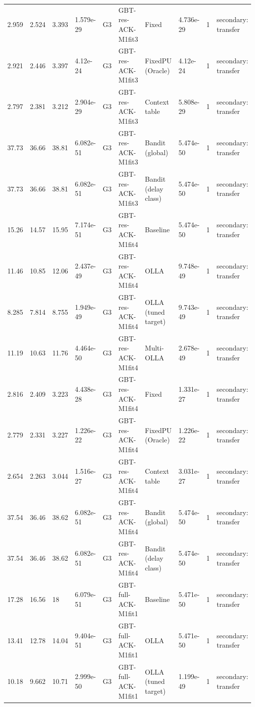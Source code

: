 \documentclass[10pt]{article}
\begin{document}
\begin{landscape}
\begin{longtable}{@{}llllllllll@{}}
2.959 & 2.524 & 3.393 & 1.579e-29 & G3 & GBT-res-ACK-M1fit3 & Fixed & 4.736e-29 & 1 & secondary: transfer \\
2.921 & 2.446 & 3.397 & 4.12e-24 & G3 & GBT-res-ACK-M1fit3 & FixedPU (Oracle) & 4.12e-24 & 1 & secondary: transfer \\
2.797 & 2.381 & 3.212 & 2.904e-29 & G3 & GBT-res-ACK-M1fit3 & Context table & 5.808e-29 & 1 & secondary: transfer \\
37.73 & 36.66 & 38.81 & 6.082e-51 & G3 & GBT-res-ACK-M1fit3 & Bandit (global) & 5.474e-50 & 1 & secondary: transfer \\
37.73 & 36.66 & 38.81 & 6.082e-51 & G3 & GBT-res-ACK-M1fit3 & Bandit (delay class) & 5.474e-50 & 1 & secondary: transfer \\
15.26 & 14.57 & 15.95 & 7.174e-51 & G3 & GBT-res-ACK-M1fit4 & Baseline & 5.474e-50 & 1 & secondary: transfer \\
11.46 & 10.85 & 12.06 & 2.437e-49 & G3 & GBT-res-ACK-M1fit4 & OLLA & 9.748e-49 & 1 & secondary: transfer \\
8.285 & 7.814 & 8.755 & 1.949e-49 & G3 & GBT-res-ACK-M1fit4 & OLLA (tuned target) & 9.743e-49 & 1 & secondary: transfer \\
11.19 & 10.63 & 11.76 & 4.464e-50 & G3 & GBT-res-ACK-M1fit4 & Multi-OLLA & 2.678e-49 & 1 & secondary: transfer \\
2.816 & 2.409 & 3.223 & 4.438e-28 & G3 & GBT-res-ACK-M1fit4 & Fixed & 1.331e-27 & 1 & secondary: transfer \\
2.779 & 2.331 & 3.227 & 1.226e-22 & G3 & GBT-res-ACK-M1fit4 & FixedPU (Oracle) & 1.226e-22 & 1 & secondary: transfer \\
2.654 & 2.263 & 3.044 & 1.516e-27 & G3 & GBT-res-ACK-M1fit4 & Context table & 3.031e-27 & 1 & secondary: transfer \\
37.54 & 36.46 & 38.62 & 6.082e-51 & G3 & GBT-res-ACK-M1fit4 & Bandit (global) & 5.474e-50 & 1 & secondary: transfer \\
37.54 & 36.46 & 38.62 & 6.082e-51 & G3 & GBT-res-ACK-M1fit4 & Bandit (delay class) & 5.474e-50 & 1 & secondary: transfer \\
17.28 & 16.56 & 18 & 6.079e-51 & G3 & GBT-full-ACK-M1fit1 & Baseline & 5.471e-50 & 1 & secondary: transfer \\
13.41 & 12.78 & 14.04 & 9.404e-51 & G3 & GBT-full-ACK-M1fit1 & OLLA & 5.471e-50 & 1 & secondary: transfer \\
10.18 & 9.662 & 10.71 & 2.999e-50 & G3 & GBT-full-ACK-M1fit1 & OLLA (tuned target) & 1.199e-49 & 1 & secondary: transfer \\

\end{longtable}
\end{landscape}
\end{document}
